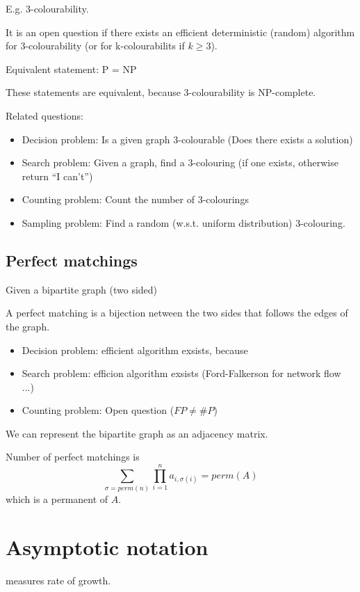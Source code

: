 \documentclass[a4paper,12pt]{article}
\theoremstyle{definition}
\theoremstyle{remark}
\begin{document}
E.g. 3-colourability.

It is an open question if there exists an efficient deterministic (random) algorithm for 3-colourability (or for k-colourabilits if $k \geq 3$).

Equivalent statement: P = NP

These statements are equivalent, because 3-colourability is NP-complete.

Related questions:
\begin{itemize}
    \item Decision problem: Is a given graph 3-colourable (Does there exists a solution)
    \item Search problem: Given a graph, find a 3-colouring (if one exists, otherwise return ``I can't'')
    \item Counting problem: Count the number of 3-colourings
    \item Sampling problem: Find a random (w.s.t. uniform distribution) 3-colouring.
\end{itemize}

\subsection{Perfect matchings}
Given a bipartite graph (two sided)

A perfect matching is a bijection netween the two sides that follows the edges of the graph.

\begin{itemize}
  \item Decision problem: efficient algorithm exsists, because
  \item Search problem: efficion algorithm exsists (Ford-Falkerson for network flow ...)
  \item Counting problem: Open question ($FP \neq \#P$)
\end{itemize}

We can represent the bipartite graph as an adjacency matrix.

Number of perfect matchings is 
\begin{equation*}
  \sum_{\sigma = perm(n)} \prod_{i = 1}^{n} a_{i, \sigma(i)} = perm(A)
\end{equation*}
which is a permanent of $A$.


\section{Asymptotic notation}
measures rate of growth.
\end{document}
